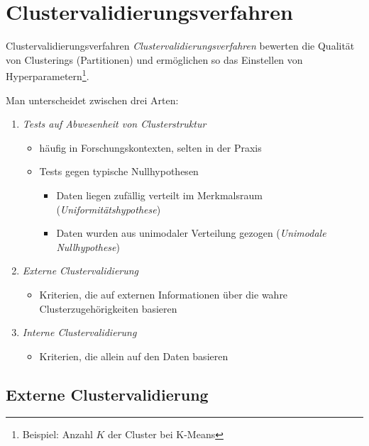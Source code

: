\section{Clustervalidierungsverfahren}

\begin{defi}{Clustervalidierungsverfahren}
    \emph{Clustervalidierungsverfahren} bewerten die Qualität von Clusterings (Partitionen) und ermöglichen so das Einstellen von Hyperparametern\footnote{Beispiel: Anzahl $K$ der Cluster bei K-Means}.

    Man unterscheidet zwischen drei Arten:
    \begin{enumerate}
        \item \emph{Tests auf Abwesenheit von Clusterstruktur}
              \begin{itemize}
                  \item häufig in Forschungskontexten, selten in der Praxis
                  \item Tests gegen typische Nullhypothesen
                        \begin{itemize}
                            \item Daten liegen zufällig verteilt im Merkmalsraum (\emph{Uniformitätshypothese})
                            \item Daten wurden aus unimodaler Verteilung gezogen (\emph{Unimodale Nullhypothese})
                        \end{itemize}
              \end{itemize}
        \item \emph{Externe Clustervalidierung}
              \begin{itemize}
                  \item Kriterien, die auf externen Informationen über die wahre Clusterzugehörigkeiten basieren
              \end{itemize}
        \item \emph{Interne Clustervalidierung}
              \begin{itemize}
                  \item Kriterien, die allein auf den Daten basieren
              \end{itemize}
    \end{enumerate}
\end{defi}

\subsection{Externe Clustervalidierung}

